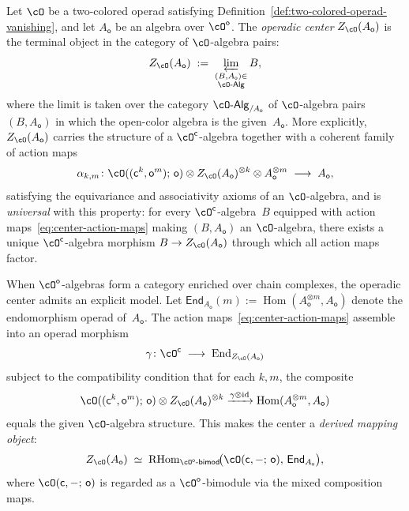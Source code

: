 \begin{definition}
\label{def:operadic-center}
Let $\cO$ be a two-colored operad satisfying
Definition~\ref{def:two-colored-operad-vanishing}, and let $A_\mathsf{o}$
be an algebra over $\cO^{\mathsf{o}}$. The \emph{operadic center}
$Z_\cO(A_\mathsf{o})$ is the terminal object in the category of
$\cO$-algebra pairs:
\[
Z_\cO(A_\mathsf{o})
\;:=\;
\varprojlim_{\substack{(B, A_\mathsf{o}) \in \\
\cO\text{-}\mathsf{Alg}}}
B,
\]
where the limit is taken over the category
$\cO\text{-}\mathsf{Alg}_{/A_\mathsf{o}}$
of $\cO$-algebra pairs $(B, A_\mathsf{o})$
in which the open-color algebra is the given~$A_\mathsf{o}$. More
explicitly, $Z_\cO(A_\mathsf{o})$ carries the structure of a
$\cO^{\mathsf{c}}$-algebra together with a coherent family of action
maps
\begin{equation}\label{eq:center-action-maps}
\alpha_{k,m}\colon
\cO((\mathsf{c}^k, \mathsf{o}^m);\, \mathsf{o})
\otimes Z_\cO(A_\mathsf{o})^{\otimes k}
\otimes A_\mathsf{o}^{\otimes m}
\;\longrightarrow\; A_\mathsf{o},
\end{equation}
satisfying the equivariance and associativity axioms of an
$\cO$-algebra, and is \emph{universal} with this property: for every
$\cO^{\mathsf{c}}$-algebra~$B$ equipped with action
maps~\eqref{eq:center-action-maps} making $(B, A_\mathsf{o})$ an
$\cO$-algebra, there exists a unique $\cO^{\mathsf{c}}$-algebra
morphism $B \to Z_\cO(A_\mathsf{o})$ through which all action maps
factor.
\end{definition}

\begin{remark}
\label{rem:center-internal-hom}
When $\cO^{\mathsf{o}}$-algebras form a category enriched over chain
complexes, the operadic center admits an explicit model. Let
$\mathsf{End}_{A_\mathsf{o}}(m) := \operatorname{Hom}(A_\mathsf{o}^{\otimes m}, A_\mathsf{o})$
denote the endomorphism operad of~$A_\mathsf{o}$. The action
maps~\eqref{eq:center-action-maps} assemble into an operad morphism
\begin{equation}\label{eq:center-operad-morphism}
\gamma\colon \cO^{\mathsf{c}} \;\longrightarrow\;
\operatorname{End}_{Z_\cO(A_\mathsf{o})}
\end{equation}
subject to the compatibility condition that for each $k, m$, the
composite
\[
\cO((\mathsf{c}^k, \mathsf{o}^m);\, \mathsf{o})
\otimes Z_\cO(A_\mathsf{o})^{\otimes k}
\xrightarrow{\gamma \otimes \mathrm{id}}
\operatorname{Hom}(A_\mathsf{o}^{\otimes m}, A_\mathsf{o})
\]
equals the given $\cO$-algebra structure. This makes the center a
\emph{derived mapping object}:
\begin{equation}\label{eq:center-as-derived-hom}
Z_\cO(A_\mathsf{o})
\;\simeq\;
\operatorname{RHom}_{\cO^{\mathsf{o}}\text{-}\mathsf{bimod}}
\!\bigl(\cO(\mathsf{c}, -;\, \mathsf{o}),\,
\mathsf{End}_{A_\mathsf{o}}\bigr),
\end{equation}
where $\cO(\mathsf{c}, -;\, \mathsf{o})$ is regarded as a
$\cO^{\mathsf{o}}$-bimodule via the mixed composition maps.
\end{remark}

